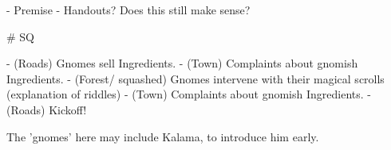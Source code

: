 
- Premise
- Handouts? Does this still make sense?

# SQ

- (Roads) Gnomes sell Ingredients.
- (Town) Complaints about gnomish Ingredients.
- (Forest/ squashed) Gnomes intervene with their magical scrolls (explanation of riddles)
- (Town) Complaints about gnomish Ingredients.
- (Roads) Kickoff!

The 'gnomes' here may include Kalama, to introduce him early.
